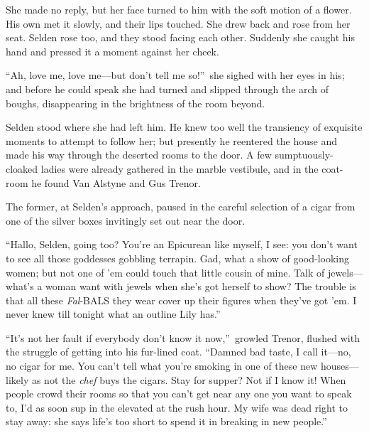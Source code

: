 \documentclass[12pt,a4paper]{book}
\begin{document}
She made no reply, but her face turned to him with the soft
motion of a flower. His own met it slowly, and their lips
touched. She drew back and rose from her seat. Selden rose too,
and they stood facing each other. Suddenly she caught his hand
and pressed it a moment against her cheek.





``Ah, love me, love me---but don't tell me so!''\ she sighed with her
eyes in his; and before he could speak she had turned and slipped
through the arch of boughs, disappearing in the brightness of the
room beyond.





Selden stood where she had left him. He knew too well the
transiency of exquisite moments to attempt to follow her; but
presently he reentered the house and made his way through the
deserted rooms to the door. A few sumptuously-cloaked ladies were
already gathered in the marble vestibule, and in the coat-room he
found Van Alstyne and Gus Trenor.





The former, at Selden's approach, paused in the careful selection
of a cigar from one of the silver boxes invitingly set out near
the door.





``Hallo, Selden, going too? You're an Epicurean like myself, I
see: you don't want to see all those goddesses gobbling terrapin. 
Gad, what a show of good-looking women; but not one of
'em could touch that little cousin of mine. Talk of
jewels---what's a woman want with jewels when she's got herself to
show? The trouble is that all these \textit{Fal}-BALS they wear cover up
their figures when they've got 'em. I never knew till tonight
what an outline Lily has.''





``It's not her fault if everybody don't know it now,''\ growled
Trenor, flushed with the struggle of getting into his fur-lined
coat. ``Damned bad taste, I call it---no, no cigar for me. You
can't tell what you're smoking in one of these new houses---likely
as not the \textit{chef} buys the cigars. Stay for supper? Not if I know
it! When people crowd their rooms so that you can't get near any
one you want to speak to, I'd as soon sup in the elevated at the
rush hour. My wife was dead right to stay away: she says life's
too short to spend it in breaking in new people.''
\end{document}
